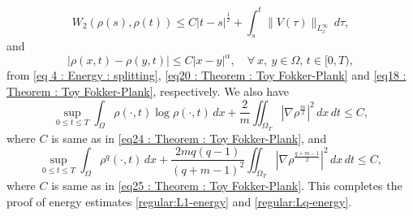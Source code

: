 \documentclass{amsart}
\numberwithin{equation}{section}
\begin{document}
\begin{equation*}\label{eq14 : Theorem : Toy Fokker-Plank}
W_{2}(\rho(s),\rho(t))\leq C |t-s|^{\frac{1}{2}} + \int_s^t
\|V(\tau)\|_{L^\infty_x}  \,d\tau,
\end{equation*}
and
\begin{equation*}
\left |\rho (x,t)-\rho(y,t)\right | \leq C |x-y|^\alpha, \quad
\forall ~x,~y \in \Omega, \, t \in [0,T),
\end{equation*}
from \eqref{eq 4 : Energy : splitting}, \eqref{eq20 : Theorem : Toy Fokker-Plank} and \eqref{eq18 : Theorem : Toy Fokker-Plank}, respectively. We also have%
\begin{equation}\label{eq28 : Theorem : Toy Fokker-Plank}
\sup_{0\leq t \leq T}\int_{\Omega} \rho (\cdot, t) \log \rho (\cdot, t)\,dx
 +  \frac{2}{m}\iint_{\Omega_T} \left|\nabla \rho^{\frac{m}{2}}\right|^2 \,dx\,dt \le C,
\end{equation}
where $C$ is same as in \eqref{eq24 : Theorem : Toy Fokker-Plank}, and  %
\begin{equation}\label{eq29 : Theorem : Toy Fokker-Plank}
 \sup_{0\leq t \leq T}\int_{\Omega} \rho^q (\cdot, t) \,dx
 +  \frac{2mq(q-1)}{(q+m-1)^2}\iint_{\Omega_T} \left|\nabla \rho^{\frac{q+m-1}{2}}\right|^2 \,dx\,dt \le  C ,
\end{equation}
where $C$ is same as in \eqref{eq25 : Theorem : Toy Fokker-Plank}. This completes the proof of energy estimates \eqref{regular:L1-energy} and \eqref{regular:Lq-energy}.
\end{document}
